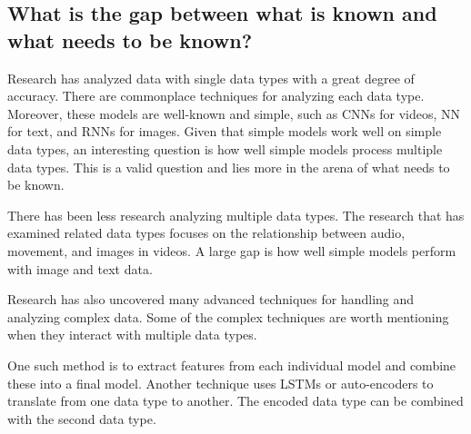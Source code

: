 \subsection{What is the gap between what is known and what needs to be known?}


Research has analyzed data with single data types with a great degree of accuracy. There are commonplace techniques for analyzing each data type.  Moreover, these models are well-known and simple, such as CNNs for videos, NN for text, and RNNs for images. Given that simple models work well on simple data types, an interesting question is how well simple models process multiple data types.  This is a valid question and lies more in the arena of what needs to be known.

There has been less research analyzing multiple data types.  The research that has examined related data types focuses on the relationship between audio, movement, and images in videos.  A large gap is how well simple models perform with image and text data.

Research has also uncovered many advanced techniques for handling and analyzing complex data. Some of the complex techniques are worth mentioning when they interact with multiple data types. %

One such method is to extract features from each individual model and combine these into a final model.  Another technique uses LSTMs or auto-encoders to translate from one data type to another.  The encoded data type can be combined with the second data type.  %









